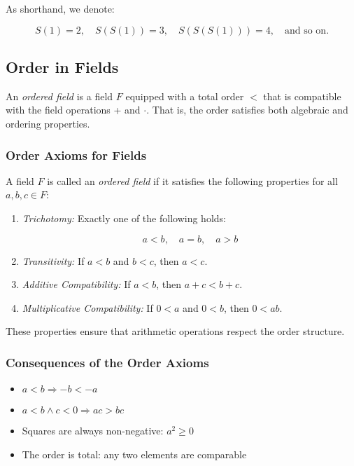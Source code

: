 As shorthand, we denote:

\[
	S(1) = 2, \quad S(S(1)) = 3, \quad S(S(S(1))) = 4, \quad \text{and so on.}
\]

\subsection{Order in Fields}

An \emph{ordered field} is a field \(F\) equipped with a total order \( < \) that is compatible with 
the field operations + and \( \cdot \). That is, the order satisfies both algebraic and ordering 
properties.

\subsubsection{Order Axioms for Fields}

A field \(F\) is called an \emph{ordered field} if it satisfies the following properties for all 
\( a, b, c \in F \):

\begin{enumerate}[label=\Roman*.]
    
	\item \emph{Trichotomy:} Exactly one of the following holds:
 
		  \[
 	   			a < b, \quad a = b, \quad a > b
    	   \]

    \item \emph{Transitivity:} If \( a < b \) and \( b < c \), then \( a < c \).

    \item \emph{Additive Compatibility:} If \( a < b \), then \( a + c < b + c \).

    \item \emph{Multiplicative Compatibility:} If \( 0 < a \) and \( 0 < b \), then \( 0 < ab \).

\end{enumerate}

These properties ensure that arithmetic operations respect the order structure.

\subsubsection{Consequences of the Order Axioms}

\begin{itemize}

	\item \( a < b \Rightarrow -b < -a \)

	\item \( a < b \land c < 0 \Rightarrow ac > bc \)

	\item Squares are always non-negative: \( a^2 \ge 0 \)

	\item The order is total: any two elements are comparable

\end{itemize}

